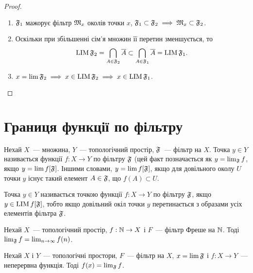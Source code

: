 \begin{proof}
    \listhack
    \begin{enumerate}
        \item $\frak F_1$ мажорує фільтр $\frak M_x$ околів точки $x$, $\frak F_1 \subset \frak F_2 \implies \frak M_x \subset \frak F_2$.

        \item Оскільки при збільшенні сім'я множин її перетин зменшується, то
        \begin{equation*}
            \LIM \frak F_2 = \bigcap_{A \in \frak F_2} \closure A \subset \bigcap_{A \in \frak F_1} \closure A = \LIM \frak F_1.
        \end{equation*}

        \item $x = \lim \frak F_2 \implies x \in \LIM \frak F_2 \implies x \in \LIM \frak F_1$. 
    \end{enumerate}
\end{proof}

\section{Границя функції по фільтру}

\begin{definition}
    Нехай $X$~--- множина, $Y$~--- топологічний простір, $\frak F$~--- фільтр на $X$. Точка $y \in Y$ називається  функції $f: X \to Y$ по фільтру $\frak F$ (цей факт позначається як $y = \lim_{\frak F} f$, якщо $y = \lim f[\frak F]$. Іншими словами, $y = \lim f [\frak F]$, якщо для довільного околу $U$ точки $y$ існує такий елемент $A \in \frak F$, що $f(A) \subset U$.
\end{definition}

\begin{definition}
    Точка $y \in Y$ називається  точкою функції $f: X \to Y$ по фільтру $\frak F$, якщо $y \in \LIM f[\frak F]$, тобто якщо довільний окіл точки $y$ перетинається з образами усіх елементів фільтра $\frak F$.
\end{definition}

\begin{example}
    Нехай $X$~--- топологічний простір, $f: \NN \to X$ і $F$~--- фільтр Фреше на $\NN$. Тоді $\lim_{\frak F} f = \lim_{n \to \infty} f(n)$.
\end{example}

\begin{theorem}
    \label{th:filter-continuity}
    Нехай $X$ і $Y$~--- топологічні простори, $F$~--- фільтр на $X$, $x = \lim \frak F$ і $f: X \to Y$~--- неперервна функція. Тоді $f(x) = \lim_{\frak F} f$.
\end{theorem}

